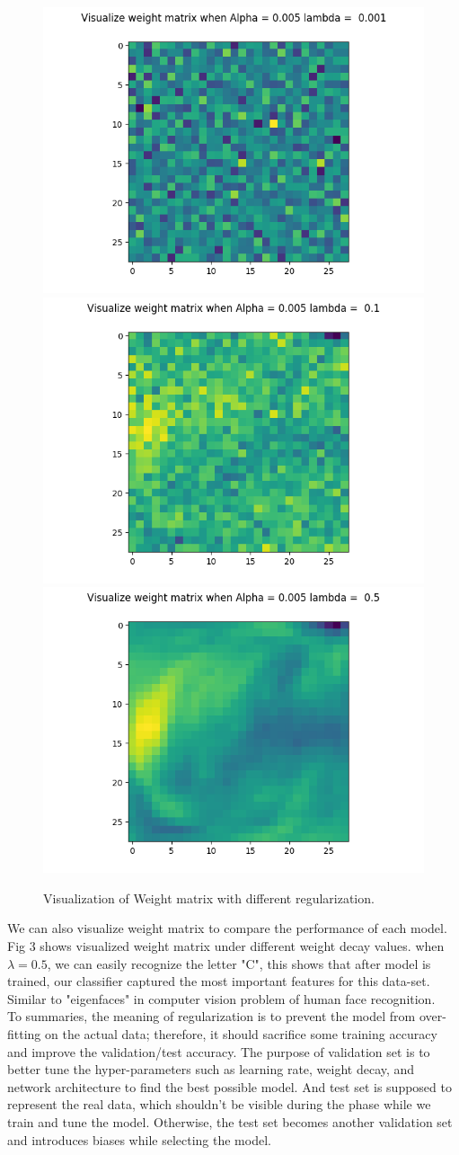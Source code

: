 \documentclass[10pt,letterpaper]{article}
\begin{document}
\begin{figure}[H]
\centering
 \begin{subfig}
  \includegraphics[width=.33\linewidth]{reg_VWM_001.png}\hfill
  \includegraphics[width=.33\linewidth]{reg_VWM_01.png}\hfill
  \includegraphics[width=.33\linewidth]{reg_VWM_05.png}
  \caption{Visualization of Weight matrix with different regularization.}
  \end{subfig}
\end{figure}

We can also visualize weight matrix to compare the performance of each model. Fig 3 shows visualized  weight matrix under different weight decay values. when $\lambda = 0.5$, we can easily recognize the letter "C", this shows that after model is trained, our classifier captured the most important features for this data-set. Similar to "eigenfaces" in computer vision problem of human face recognition. \\



To summaries, the meaning of regularization is to prevent the model from over-fitting on the actual data; therefore, it should sacrifice some training accuracy and improve the validation/test accuracy. The purpose of validation set is to better tune the hyper-parameters such as learning rate, weight decay, and network architecture to find the best possible model. And test set is supposed to represent the real data, which shouldn't be visible during the phase while we train and tune the model. Otherwise, the test set becomes another validation set and introduces biases while selecting the model. 
\end{document}
